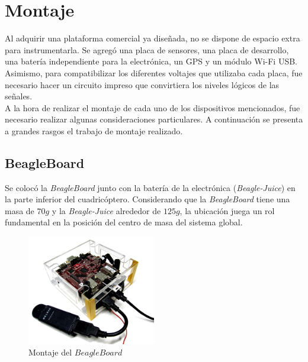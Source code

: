 \documentclass[main]{subfiles}
\begin{document}
\chapter{Montaje}
\label{chap:montaje}

Al adquirir una plataforma comercial ya diseñada, no se dispone de espacio extra para instrumentarla. Se agregó una placa de sensores, una placa de desarrollo, una batería independiente para la electrónica, un GPS y un módulo Wi-Fi USB. Asimismo, para compatibilizar los diferentes voltajes que utilizaba cada placa, fue necesario hacer un circuito impreso que convirtiera los niveles lógicos de las señales.\\

A la hora de realizar el montaje de cada uno de los dispositivos mencionados, fue necesario realizar algunas consideraciones particulares. A continuación se presenta a grandes rasgos el trabajo de montaje realizado.

\section{BeagleBoard}

Se coloc\'o la \emph{BeagleBoard} junto con la batería de la electrónica (\emph{Beagle-Juice}) en la parte inferior del cuadricóptero. Considerando que la \emph{BeagleBoard} tiene una masa de $70g$ y la \emph{Beagle-Juice} alrededor de $125g$, la ubicación juega un rol fundamental en la posición del centro de masa del sistema global.\\

\begin{figure}
	\centering
	\vspace{-20pt}
		\includegraphics[width=0.5\textwidth]{./pics_montaje/beagle.jpg}
	\caption{Montaje del $BeagleBoard$}
	\vspace{-20pt}
	\label{fig:beagle}
\end{figure}
\end{document}
